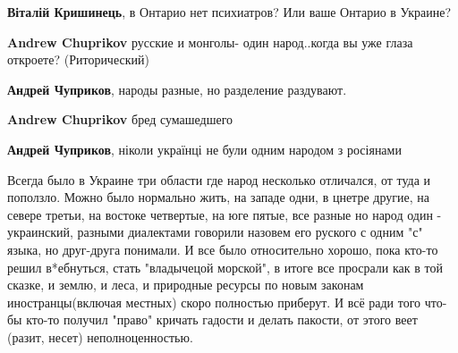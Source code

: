 \begin{itemize}
\begin{itemize}
 
\textbf{Віталій Кришинець}, в Онтарио нет психиатров? Или ваше Онтарио в Украине?

 
\textbf{Andrew Chuprikov} русские и монголы- один народ..когда вы уже глаза откроете? (Риторический)

 
\textbf{Андрей Чуприков}, народы разные, но разделение раздувают.

 
\textbf{Andrew Chuprikov} бред сумашедшего

 
\textbf{Андрей Чуприков}, ніколи українці не були одним народом з росіянами

 

Всегда было в Украине три области где народ несколько отличался, от туда и
поползло. Можно было нормально жить, на западе одни, в цнетре другие, на севере
третьи, на востоке четвертые, на юге пятые, все разные но народ один -
украинский, разными диалектами говорили назовем его руского с одним "с" языка,
но друг-друга понимали. И все было относительно хорошо, пока кто-то решил
в*ебнуться, стать "владычецой морской", в итоге все просрали как в той сказке,
и землю, и леса, и природные ресурсы по новым законам иностранцы(включая
местных) скоро полностью приберут. И всё ради того что-бы кто-то получил
"право" кричать гадости и делать пакости, от этого веет (разит, несет)
неполноценностью.



\end{itemize}
\end{itemize}
